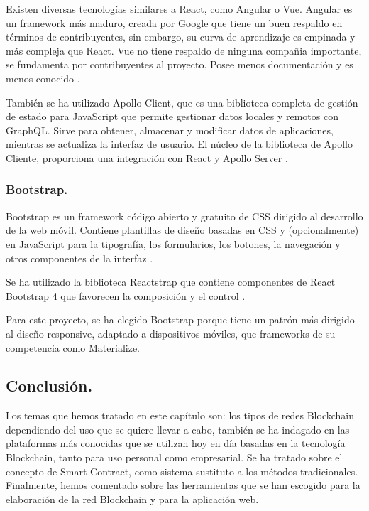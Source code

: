 \vspace{5mm}

\noindent Existen diversas tecnologías similares a React, como Angular o Vue. Angular es un framework más maduro, 
creada por Google que tiene un buen respaldo en términos de contribuyentes, sin embargo, su curva de aprendizaje es 
empinada y más compleja que React. Vue no tiene respaldo de ninguna compañia importante, se fundamenta por 
contribuyentes al proyecto. Posee menos documentación y es menos conocido \cite{angular-react-vue}. 

\vspace{5mm}

\noindent También se ha utilizado Apollo Client, que es una biblioteca completa de gestión de estado para JavaScript 
que permite gestionar datos locales y remotos con GraphQL. Sirve para obtener, almacenar y modificar datos de 
aplicaciones, mientras se actualiza la interfaz de usuario. El núcleo de la biblioteca de Apollo Cliente, proporciona 
una integración con React y Apollo Server \cite{introduction-apollo-client}.

\subsubsection*{Bootstrap.}

Bootstrap es un framework código abierto y gratuito de CSS dirigido al desarrollo de la web móvil. Contiene 
plantillas de diseño basadas en CSS y (opcionalmente) en JavaScript para la tipografía, los formularios, los botones, 
la navegación y otros componentes de la interfaz \cite{bootstrap}.

\vspace{5mm}

\noindent Se ha utilizado la biblioteca Reactstrap que contiene componentes de React Bootstrap 4 que favorecen la 
composición y el control \cite{reactstrap}.

\vspace{5mm}

\noindent Para este proyecto, se ha elegido Bootstrap porque tiene un patrón más dirigido al diseño responsive, 
adaptado a dispositivos móviles, que frameworks de su competencia como Materialize.

\subsection{Conclusión.}

Los temas que hemos tratado en este capítulo son: los tipos de redes Blockchain dependiendo del uso que se quiere 
llevar a cabo, también se ha indagado en las plataformas más conocidas que se utilizan hoy en día basadas en la 
tecnología Blockchain, tanto para uso personal como empresarial. Se ha tratado sobre el concepto de Smart Contract, 
como sistema sustituto a los métodos tradicionales. Finalmente, hemos comentado sobre las herramientas que se han 
escogido para la elaboración de la red Blockchain y para la aplicación web.

\newpage
